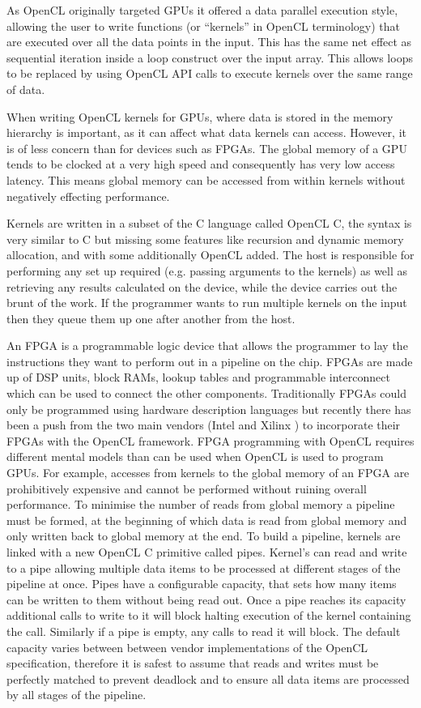 \documentclass{mpaper}
\begin{document}
As OpenCL originally targeted GPUs it offered a data parallel execution style, allowing the user to write functions (or ``kernels'' in OpenCL terminology) that are executed over all the data points in the input.
This has the same net effect as sequential iteration inside a loop construct over the input array.  
This allows loops to be replaced by using OpenCL API calls to execute kernels over the same range of data.  

When writing OpenCL kernels for GPUs, where data is stored in the memory hierarchy is important, as it can affect what data kernels can access.
However, it is of less concern than for devices such as FPGAs.
The global memory of a GPU tends to be clocked at a very high speed and consequently has very low access latency.
This means global memory can be accessed from within kernels without negatively effecting performance. 

Kernels are written in a subset of the C language called OpenCL C, the syntax is very similar to C but missing some features like recursion and dynamic memory allocation, and with some additionally OpenCL added.
The host is responsible for performing any set up required (e.g. passing arguments to the kernels) as well as retrieving any results calculated on the device, while the device carries out the brunt of the work.
If the programmer wants to run multiple kernels on the input then they queue them up one after another from the host.

An FPGA is a programmable logic device that allows the programmer to lay the instructions they want to perform out in a pipeline on the chip.
FPGAs are made up of DSP units, block RAMs, lookup tables and programmable interconnect which can be used to connect the other components. 
Traditionally FPGAs could only be programmed using hardware description languages but recently there has been a push from the two main vendors (Intel and Xilinx \cite{IntelCorporation, Xilinx}) to incorporate their FPGAs with the OpenCL framework.
FPGA programming with OpenCL requires different mental models than can be used when OpenCL is used to program GPUs.
For example, accesses from kernels to the global memory of an FPGA are prohibitively expensive and cannot be performed without ruining overall performance.
To minimise the number of reads from global memory a pipeline must be formed, at the beginning of which data is read from global memory and only written back to global memory at the end.
To build a pipeline, kernels are linked with a new OpenCL C primitive called pipes.
Kernel's can read and write to a pipe allowing multiple data items to be processed at different stages of the pipeline at once.
Pipes have a configurable capacity, that sets how many items can be written to them without being read out.
Once a pipe reaches its capacity additional calls to write to it will block halting execution of the kernel containing the call.
Similarly if a pipe is empty, any calls to read it will block.
The default capacity varies between between vendor implementations of the OpenCL specification, therefore it is safest to assume that reads and writes must be perfectly matched to prevent deadlock and to ensure all data items are processed by all stages of the pipeline. 
\end{document}
